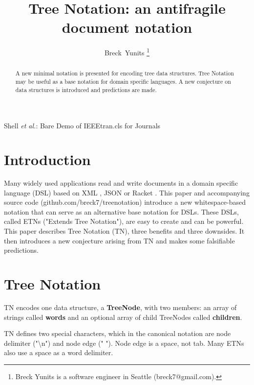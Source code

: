 \documentclass[journal]{IEEEtran}
\begin{document}
\title{Tree Notation: an antifragile document notation}

\author{Breck~Yunits%
\thanks{Breck Yunits is a software engineer in Seattle (breck7@gmail.com).}%
}

%
{Shell \MakeLowercase{\textit{et al.}}: Bare Demo of IEEEtran.cls for Journals}

\maketitle


\begin{abstract}
A new minimal notation is presented for encoding tree data structures. Tree Notation may be useful as a base notation for domain specific languages. A new conjecture on data structures is introduced and predictions are made.

\end{abstract}

\IEEEpeerreviewmaketitle

\section{Introduction}

Many widely used applications read and write documents in a domain specific language (DSL) based on XML \cite{Bray}, JSON \cite{Crockford} or Racket \cite{Racket}. This paper and accompanying source code (github.com/breck7/treenotation) introduce a new whitespace-based notation that can serve as an alternative base notation for DSLs. These DSLs, called ETNs ("Extends Tree Notation"), are easy to create and can be powerful. This paper describes Tree Notation (TN), three benefits and three downsides. It then introduces a new conjecture arising from TN and makes some falsifiable predictions.

\section{Tree Notation}

TN encodes one data structure, a \textbf{TreeNode}, with two members: an array of strings called \textbf{words} and an optional array of child TreeNodes called \textbf{children}.

TN defines two special characters, which in the canonical notation are node delimiter ("\textbackslash n") and node edge (" "). Node edge is a space, not tab. Many ETNs also use a space as a word delimiter.
\end{document}
